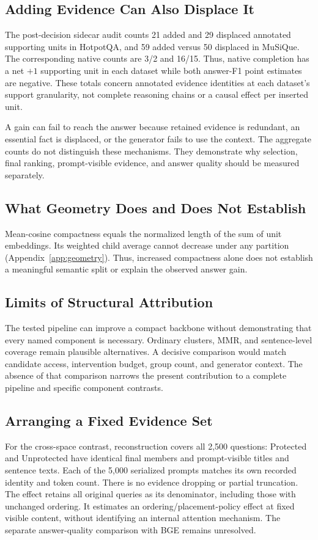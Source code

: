 \documentclass[11pt]{article}
\begin{document}
\subsection{Adding Evidence Can Also Displace It}
The post-decision sidecar audit counts 21 added and 29 displaced annotated
supporting units in HotpotQA, and 59 added versus 50 displaced in MuSiQue.
The corresponding native counts are 3/2 and 16/15.
Thus, native completion has a net $+1$ supporting unit in each dataset while
both answer-F1 point estimates are negative. These totals concern annotated
evidence identities at each dataset's support granularity, not complete
reasoning chains or a causal effect per inserted unit.

A gain can fail to reach the answer because retained evidence is redundant,
an essential fact is displaced, or the generator fails to use the context.
The aggregate counts do not distinguish these mechanisms. They demonstrate
why selection, final ranking, prompt-visible evidence, and answer quality
should be measured separately.

\subsection{What Geometry Does and Does Not Establish}
Mean-cosine compactness equals the normalized length of the sum of unit
embeddings. Its weighted child average cannot decrease under any partition
(Appendix~\ref{app:geometry}). Thus, increased compactness alone does not
establish a meaningful semantic split or explain the observed answer gain.

\subsection{Limits of Structural Attribution}
The tested pipeline can improve a compact backbone without demonstrating that
every named component is necessary. Ordinary clusters, MMR, and sentence-level
coverage remain plausible alternatives. A decisive comparison would match
candidate access, intervention budget, group count, and generator context.
The absence of that comparison narrows the present contribution to a complete
pipeline and specific component contrasts.

\subsection{Arranging a Fixed Evidence Set}
For the cross-space contrast, reconstruction covers all 2,500 questions: Protected and
Unprotected have identical final members and prompt-visible titles and
sentence texts. Each of the 5,000 serialized prompts matches its own recorded
identity and token count. There is no evidence dropping or partial truncation.
The effect retains all original queries as its denominator, including those
with unchanged ordering. It estimates an ordering/placement-policy effect at
fixed visible content, without identifying an internal attention mechanism.
The separate answer-quality comparison with BGE remains unresolved.
\end{document}
